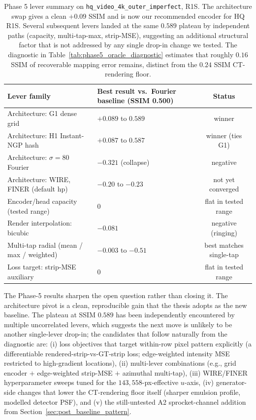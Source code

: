 \documentclass[11pt,a4paper]{article}
\begin{document}
\begin{table}[H]
\centering
\begin{tabular}{llc}
\toprule
Lever family & Best result vs.\ Fourier baseline (SSIM 0.500) & Status \\
\midrule
Architecture: G1 dense grid                & $+0.089$ to $0.589$ & winner \\
Architecture: H1 Instant-NGP hash          & $+0.087$ to $0.587$ & winner (ties G1) \\
Architecture: $\sigma=80$ Fourier          & $-0.321$ (collapse) & negative \\
Architecture: WIRE, FINER (default hp)     & $-0.20$ to $-0.23$   & not yet converged \\
Encoder/head capacity (tested range)       & $0$                 & flat in tested range \\
Render interpolation: bicubic              & $-0.081$            & negative (ringing) \\
Multi-tap radial (mean / max / weighted)   & $-0.003$ to $-0.51$ & best matches single-tap \\
Loss target: strip-MSE auxiliary           & $0$                 & flat in tested range \\
\bottomrule
\end{tabular}
\caption{Phase 5 lever summary on \texttt{hq\_video\_4k\_outer\_imperfect}, R1S. The architecture swap gives a clean $+0.09$ SSIM and is now our recommended encoder for HQ R1S. Several subsequent levers landed at the same $0.589$ plateau by independent paths (capacity, multi-tap-max, strip-MSE), suggesting an additional structural factor that is not addressed by any single drop-in change we tested. The diagnostic in Table~\ref{tab:phase5_oracle_diagnostic} estimates that roughly $0.16$ SSIM of recoverable mapping error remains, distinct from the $0.24$ SSIM CT-rendering floor.}
\label{tab:phase5_summary}
\end{table}

The Phase-5 results sharpen the open question rather than closing it. The architecture pivot is a clean, reproducible gain that the thesis adopts as the new baseline. The plateau at SSIM $0.589$ has been independently encountered by multiple uncorrelated levers, which suggests the next move is unlikely to be another single-lever drop-in; the candidates that follow naturally from the diagnostic are: (i) loss objectives that target within-row pixel pattern explicitly (a differentiable rendered-strip-vs-GT-strip loss; edge-weighted intensity MSE restricted to high-gradient locations), (ii) multi-lever combinations (e.g., grid encoder $+$ edge-weighted strip-MSE $+$ azimuthal multi-tap), (iii) WIRE/FINER hyperparameter sweeps tuned for the $143{,}558$-px-effective $u$-axis, (iv) generator-side changes that lower the CT-rendering floor itself (sharper emulsion profile, modelled detector PSF), and (v) the still-untested A2 sprocket-channel addition from Section~\ref{sec:post_baseline_pattern}.
\end{document}

